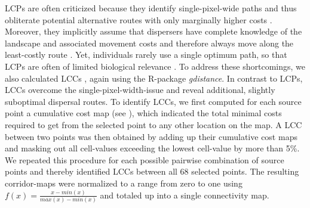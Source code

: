 \documentclass[abstract=on,10pt,a4paper,bibliography=totocnumbered]{scrartcl}
\begin{document}
LCPs are often criticized because they identify single-pixel-wide paths and thus
obliterate potential alternative routes with only marginally higher costs
\citep{Pinto.2009}. Moreover, they implicitly assume that dispersers have
complete knowledge of the landscape and associated movement costs and therefore
always move along the least-costly route \citep{Carroll.2012}. Yet, individuals
rarely use a single optimum path, so that LCPs are often of limited biological
relevance \citep{Pinto.2009, Pullinger.2010}. To address these shortcomings, we
also calculated LCCs \citep{Pinto.2009, Sawyer.2011}, again using the R-package
\textit{gdistance}. In contrast to LCPs, LCCs overcome the
single-pixel-width-issue and reveal additional, slightly suboptimal dispersal
routes. To identify LCCs, we first computed for each source point a cumulative
cost map (see ), which indicated the total minimal costs
required to get from the selected point to any other location on the map. A LCC
between two points was then obtained by adding up their cumulative cost maps and
masking out all cell-values exceeding the lowest cell-value by more than 5\%. We
repeated this procedure for each possible pairwise combination of source points
and thereby identified LCCs between all 68 selected points. The resulting
corridor-maps were normalized to a range from zero to one using \(f(x) = \frac{x
- min(x)}{max(x) - min(x)}\) and totaled up into a single connectivity map.
\end{document}
